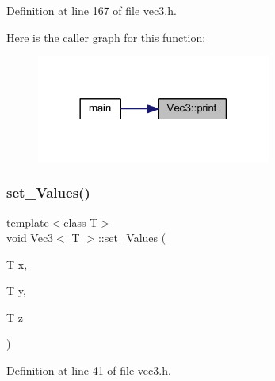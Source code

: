 Definition at line 167 of file vec3.\+h.

Here is the caller graph for this function\+:
\nopagebreak
\begin{figure}[H]
\begin{center}
\leavevmode
\includegraphics[width=218pt]{class_vec3_af10c9e364bdec9abd60045bf3d523293_icgraph}
\end{center}
\end{figure}
\mbox{\label{class_vec3_ae581dad3aa1a885da7538582a3324d3a}} 
\subsubsection{\texorpdfstring{set\_Values()}{set\_Values()}}
{\footnotesize\ttfamily template$<$class T$>$ \\
void \mbox{\hyperlink{class_vec3}{Vec3}}$<$ T $>$\+::set\+\_\+\+Values (\begin{DoxyParamCaption}\item[{T}]{x,  }\item[{T}]{y,  }\item[{T}]{z }\end{DoxyParamCaption})\hspace{0.3cm}{\ttfamily [inline]}}



Definition at line 41 of file vec3.\+h.

